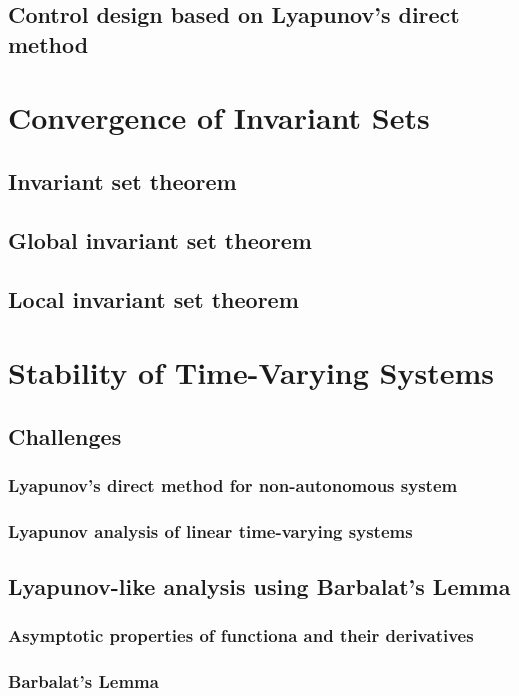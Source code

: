 \documentclass{article}
\begin{document}
\subsection{Control design based on Lyapunov's direct method}

\section{Convergence of Invariant Sets}
\subsection{Invariant set theorem}
\subsection{Global invariant set theorem}
\subsection{Local invariant set theorem}

\section{Stability of Time-Varying Systems}
\subsection{Challenges}
\subsubsection{Lyapunov's direct method for non-autonomous system}
\subsubsection{Lyapunov analysis of linear time-varying systems}
\subsection{Lyapunov-like analysis using Barbalat's Lemma}
\subsubsection{Asymptotic properties of functiona and their derivatives}
\subsubsection{Barbalat's Lemma}
\end{document}
